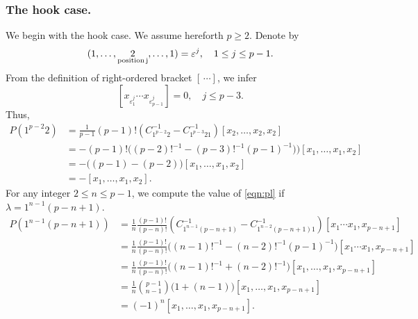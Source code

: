 \documentclass[12pt]{article}
\begin{document}
\subsubsection{The hook case.} We begin with the hook case. We assume hereforth $p \geq 2$.
Denote by
$$
(1,\ldots,\underset{\rm position\,j}{2},\ldots,1) = \varepsilon^j,\quad 1\leq j \leq p-1.
$$ From the definition of right-ordered bracket $[\,\cdots]$, we infer
$$
[x_{\varepsilon^j_1} \cdots x_{\varepsilon^j_{p-1}}] = 0, \quad j\leq p-3.
$$
Thus, 
\begin{align*}
P(1^{p-2}2) &= \frac{1}{p-1}{(p-1)!}(C_{1^{p-2}2}^{-1} - C_{1^{p-3}21}^{-1})[x_2,\ldots,x_2,x_2]\\
&=-{(p-1)!}\bigl((p-2)!^{-1} - (p-3)!^{-1}(p-1)^{-1})\bigl)[x_1,\ldots,x_1,x_2] \\
&=-{\bigl((p-1) - (p-2)\bigl)}[x_1,\ldots,x_1,x_2]\\
&=-[x_1,\ldots,x_1,x_2].
\end{align*}
For any integer $2\leq n \leq p-1$, we compute the value of \eqref{eqn:pl} if $\lambda = 1^{n-1}(p-n+1)$.
\begin{align*}
P(1^{n-1}(p-n+1))&=\frac{1}{n}\frac{(p-1)!}{(p-n)!}(C^{-1}_{1^{n-1}(p-n+1)} - C^{-1}_{1^{n-2}(p-n+1)1})[x_1\cdots x_1,x_{p-n+1}] \\
&=\frac{1}{n}\frac{(p-1)!}{(p-n)!}\bigl((n-1)!^{-1} - (n-2)!^{-1}(p-1)^{-1}\bigl)[x_1\cdots x_1,x_{p-n+1}]\\
&=\frac{1}{n}\frac{(p-1)!}{(p-n)!}\bigl((n-1)!^{-1} + (n-2)!^{-1}\bigl)[x_1,\ldots, x_1, x_{p-n+1}]\\
&=\frac{1}{n}\binom{p-1}{n-1}\bigl(1+(n-1)\bigl)[x_1,\ldots,x_1,x_{p-n+1}] \\
&=(-1)^{n}[x_1,\ldots,x_1, x_{p-n+1}].
\end{align*}
\end{document}
